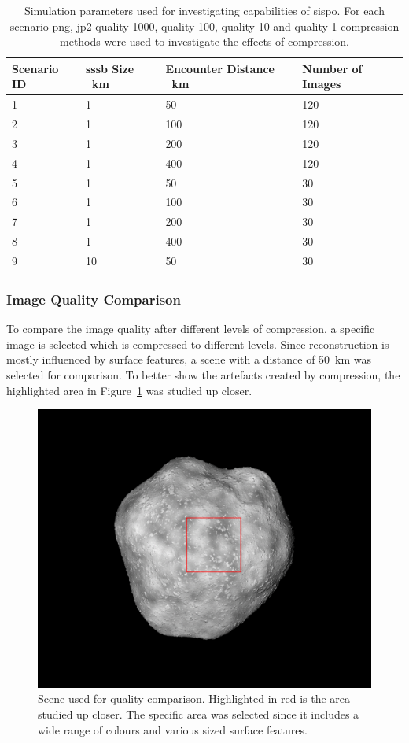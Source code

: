 \begin{table}[htb]
    \centering
    \caption{Simulation parameters used for investigating capabilities of \gls{sispo}. For each scenario \gls{png}, \gls{jp2} quality 1000, quality 100, quality 10 and quality 1 compression methods were used to investigate the effects of compression.}
    \label{tab:sim_params}
    \begin{tabular}{l|lll}
        Scenario ID  & \gls{sssb} Size \SI{}{\kilo\meter} & Encounter Distance \SI{}{\kilo\meter} & Number of Images \\ \hline
        1 & 1  & 50  & 120\\
        2 & 1  & 100 & 120\\
        3 & 1  & 200 & 120\\
        4 & 1  & 400 & 120\\
        5 & 1  & 50  & 30\\
        6 & 1  & 100 & 30\\
        7 & 1  & 200 & 30\\
        8 & 1  & 400 & 30\\
        9 & 10 & 50  & 30\\
    \end{tabular}
\end{table}

\subsubsection{Image Quality Comparison} \label{sec:img_quali_comp}
To compare the image quality after different levels of compression, a specific image is selected which is compressed to different levels. Since reconstruction is mostly influenced by surface features, a scene with a distance of \SI{50}{\kilo\meter} was selected for comparison. To better show the artefacts created by compression, the highlighted area in Figure~\ref{fig:img_quality_frame} was studied up closer.

\begin{figure}[htb]
    \centering
    \includegraphics[width=.7\textwidth]{doc/thesis/0_figures/compare_quality/set1/framed/jp2_1000_frame.png}
    \caption{Scene used for quality comparison. Highlighted in red is the area studied up closer. The specific area was selected since it includes a wide range of colours and various sized surface features.}
    \label{fig:img_quality_frame}
\end{figure}

